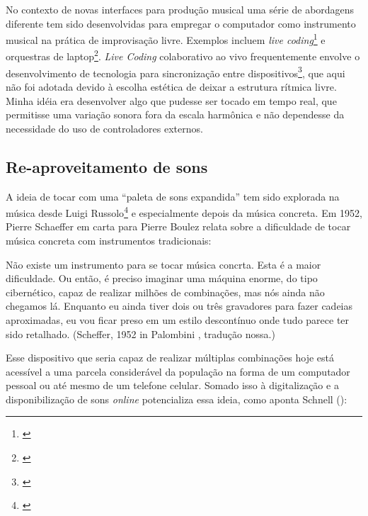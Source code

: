 No contexto de novas interfaces para produção musical uma série de abordagens diferente tem sido desenvolvidas para empregar o computador como instrumento musical na prática de improvisação livre. Exemplos incluem \emph{live coding}\footnote{\cite{freeman2011collaborative}} e orquestras de laptop\footnote{\cite{Albert2012}}. \emph{Live Coding} colaborativo ao vivo frequentemente envolve o desenvolvimento de tecnologia para sincronização entre dispositivos\footnote{\cite{Wilson2014}}, que aqui não foi adotada devido à escolha estética de deixar a estrutura rítmica livre. Minha idéia era desenvolver algo que pudesse ser tocado em tempo real, que permitisse uma variação sonora fora da escala harmônica e não dependesse da necessidade do uso de controladores externos.


\subsection{Re-aproveitamento de sons}

A ideia de tocar com uma ``paleta de sons expandida'' tem sido explorada na música desde Luigi Russolo\footnote{\cite{Merz2013}} e especialmente depois da música concreta. Em 1952, Pierre Schaeffer em carta para Pierre Boulez relata sobre a dificuldade de tocar música concreta com instrumentos tradicionais: 

\begin{citacao}
Não existe um instrumento para se tocar música concrta. Esta é a maior dificuldade. Ou então, é preciso imaginar uma máquina enorme, do tipo cibernético, capaz de realizar milhões de combinações, mas nós ainda não chegamos lá. Enquanto eu ainda tiver dois ou três gravadores para fazer cadeias aproximadas, eu vou ficar preso em um estilo descontínuo onde tudo parece ter sido retalhado. (Scheffer, 1952 in Palombini \citeyear{Palombini1993}, tradução nossa.)

\end{citacao}

Esse dispositivo que seria capaz de realizar múltiplas combinações hoje está acessível a uma parcela considerável da população na forma de um computador pessoal ou até mesmo de um telefone celular. Somado isso à digitalização e a disponibilização de sons \emph{online} potencializa essa ideia, como aponta Schnell (\citeyear{Schnell2013}):

